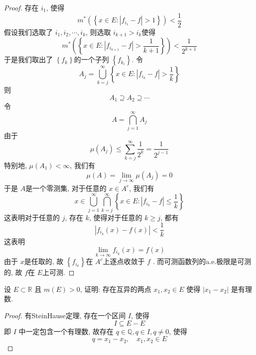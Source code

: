 \documentclass[../main.tex]{subfiles}
\begin{document}
\begin{proof}
     存在 \(  i_1  \), 使得 \[
     m^{*}\left( \left\{ x \in E: \left| f_{i_1}-f \right|> 1  \right\} \right)< \frac{1 }{2 }  
     \] 假设我们选取了 \(  i_1,i_2,\cdots ,i_{k}  \), 则选取 \(  i_{k+ 1}> i_{k}  \)使得 \[
     m^{*}\left( \left\{ x \in E: \left| f_{i_{k+ 1}}-f \right|  > \frac{1 }{k+ 1 } \right\} \right)< \frac{1 }{2^{k+ 1} }  
     \]  于是我们取出了 \(  \left\{ f_{k} \right\}  \)的一个子列 \(  \left\{ f_{k_{i}} \right\}  \). 令 \[
     A_{j}= \bigcup _{k= j}^{\infty}\left\{ x \in E: \left| f_{i_{k}}-f \right|  > \frac{1 }{k } \right\}
     \]  则 \[
     A_1\supseteq A_2\supseteq \cdots 
     \]令 \[
     A= \bigcap _{j = 1}^{\infty}A_{j}
     \]由于 \[
     \mu \left( A_{j} \right)\le \sum _{k= j}^{\infty} \frac{1 }{2^{k} }= \frac{1 }{2^{j-1} }   
     \]特别地, \(  \mu \left( A_1 \right)< \infty   \), 我们有 \[
     \mu \left( A \right)= \lim_{j\to \infty}\mu \left( A_{j} \right)= 0  
     \] 于是 \(  A  \)是一个零测集, 对于任意的 \(  x\in A^{c}  \), 我们有 \[
     x \in \bigcup _{j = 1}^{\infty}\bigcap _{k = j}^{\infty}\left\{ x \in E: \left| f_{i_{k}}-f \right|\le \frac{1 }{k }   \right\}
     \]  这表明对于任意的 \(  j \), 存在 \( k \), 使得对于任意的 \(  k\ge j  \), 都有    \[
     \left| f_{i_{k}}\left( x \right)-f\left( x \right)   \right|< \frac{1 }{k }  
     \]这表明 \[
     \lim_{k\to \infty}f_{i_{k}}\left( x \right)= f\left( x \right)  
     \] 由于 \(  x  \)是任取的, 故 \(  \left\{ f_{i_{k}} \right\}  \)在 \(  A^{c}  \)上逐点收敛于 \(  f  \)    . 而可测函数列的a.e.极限是可测的, 故 \(  f  \)在 \(  E  \)上可测.  
\end{proof}
\begin{exercise}{}{}
设 $E \subset \mathbb{R}$ 且 $m(E) > 0$, 证明: 存在互异的两点 $x_1, x_2 \in E$ 使得 $|x_1 - x_2|$ 是有理数.
\end{exercise}
 \begin{proof}
    有SteinHause定理, 存在一个区间 \(  I  \), 使得 \[
    I\subseteq E-E
    \] 即 \(  I  \) 中一定包含一个有理数, 故存在 \(  q \in \mathbb{Q} , q \in I, q\neq 0  \), 使得 \[
    q= x_1-x_2, \quad x_1,x_2\in E
    \]  
 \end{proof}
\end{document}
